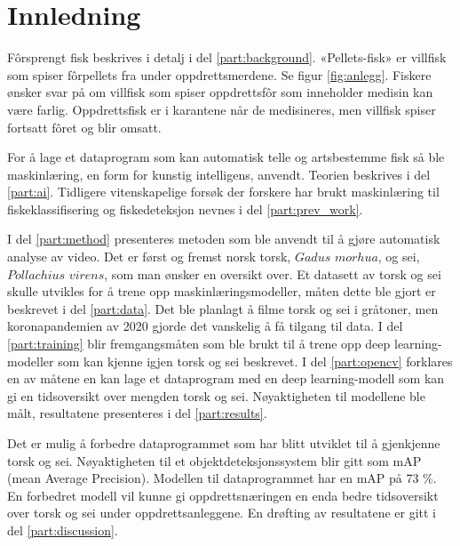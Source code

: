 \section{Innledning}




Fôrsprengt fisk beskrives i detalj i del \ref{part:background}. «Pellets-fisk» er villfisk som spiser fôrpellets fra under oppdrettsmerdene. Se figur \ref{fig:anlegg}. Fiskere ønsker svar på om villfisk som spiser oppdrettsfôr som inneholder medisin kan være farlig. Oppdrettsfisk er i karantene når de medisineres, men villfisk spiser fortsatt fôret og blir omsatt.

For å lage et dataprogram som kan automatisk telle og artsbestemme fisk så ble maskinlæring, en form for kunstig intelligens, anvendt. Teorien beskrives i del \ref{part:ai}. Tidligere vitenskapelige forsøk der forskere har brukt maskinlæring til fiskeklassifisering og fiskedeteksjon nevnes i del \ref{part:prev_work}. 

I del \ref{part:method} presenteres metoden som ble anvendt til å gjøre automatisk analyse av video. Det er først og fremst norsk torsk, $Gadus$ $morhua$, og sei, $Pollachius$ $virens$, som man ønsker en oversikt over. Et datasett av torsk og sei skulle utvikles for å trene opp maskinlæringsmodeller, måten dette ble gjort er beskrevet i del \ref{part:data}. Det ble planlagt å filme torsk og sei i gråtoner, men koronapandemien av 2020 gjorde det vanskelig å få tilgang til data. I del \ref{part:training} blir fremgangsmåten som ble brukt til å trene opp deep learning-modeller som kan kjenne igjen torsk og sei beskrevet. I del \ref{part:opencv} forklares en av måtene en kan lage et dataprogram med en deep learning-modell som kan gi en tidsoversikt over mengden torsk og sei. Nøyaktigheten til modellene ble målt, resultatene presenteres i del \ref{part:results}.

Det er mulig å forbedre dataprogrammet som har blitt utviklet til å gjenkjenne torsk og sei. Nøyaktigheten til et objektdeteksjonssystem blir gitt som mAP (mean Average Precision). Modellen til dataprogrammet har en mAP på 73 \%. En forbedret modell vil kunne gi oppdrettsnæringen en enda bedre tidsoversikt over torsk og sei under oppdrettsanleggene. En drøfting av resultatene er gitt i del \ref{part:discussion}.

